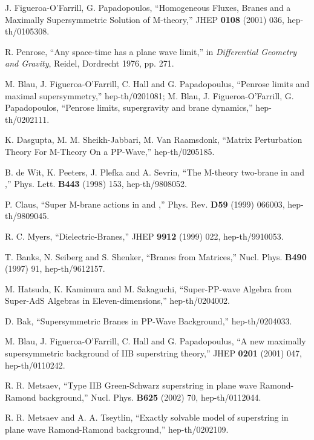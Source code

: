\documentclass[a4paper,12pt]{article}
\begin{document}
\begin{thebibliography}{99}
J. Figueroa-O'Farrill, G. Papadopoulos, ``Homogeneous Fluxes,
Branes and a Maximally Supersymmetric Solution of M-theory,'' JHEP
{\bf 0108} (2001)  036, hep-th/0105308.

 R. Penrose, ``Any space-time has a plane wave
limit,'' in {\it Differential Geometry and Gravity}, Reidel,
Dordrecht 1976, pp. 271.

 M. Blau, J. Figueroa-O'Farrill, C. Hall and G.
Papadopoulus, ``Penrose limits and maximal supersymmetry,''
hep-th/0201081; M. Blau, J. Figueroa-O'Farrill, G. Papadopoulos,
``Penrose limits, supergravity and brane dynamics,''
hep-th/0202111.

 K. Dasgupta, M. M. Sheikh-Jabbari, M. Van
Raamsdonk, ``Matrix Perturbation Theory For M-Theory On a
PP-Wave,'' hep-th/0205185.

 B. de Wit, K. Peeters, J. Plefka and A. Sevrin,
``The M-theory two-brane in \coordHE{} and \coordHE{},'' Phys. Lett. {\bf B443} (1998) 153, hep-th/9808052.

 P. Claus, ``Super M-brane actions in \coordHE{} and \coordHE{},'' Phys. Rev. {\bf D59} (1999)
066003, hep-th/9809045.

 R. C. Myers, ``Dielectric-Branes,'' JHEP {\bf
9912} (1999) 022, hep-th/9910053.

 T. Banks, N. Seiberg and S. Shenker, ``Branes
from Matrices,'' Nucl. Phys. {\bf B490} (1997) 91, hep-th/9612157.

 M. Hatsuda, K. Kamimura and M. Sakaguchi,
``Super-PP-wave Algebra from Super-AdS\coordHE{} Algebras in
Eleven-dimensions,'' hep-th/0204002.

 D. Bak, ``Supersymmetric Branes in PP-Wave
Background,'' hep-th/0204033.

 M. Blau, J. Figueroa-O'Farrill, C. Hall and G.
Papadopoulus, ``A new maximally supersymmetric background of IIB
superstring theory,'' JHEP {\bf 0201} (2001) 047, hep-th/0110242.

 R. R. Metsaev, ``Type IIB Green-Schwarz
superstring in plane wave Ramond-Ramond background,'' Nucl. Phys.
{\bf B625} (2002) 70, hep-th/0112044.

 R. R. Metsaev and A. A. Tseytlin, ``Exactly
solvable model of superstring in plane wave Ramond-Ramond
background,'' hep-th/0202109.


\end{thebibliography}
\end{document}
